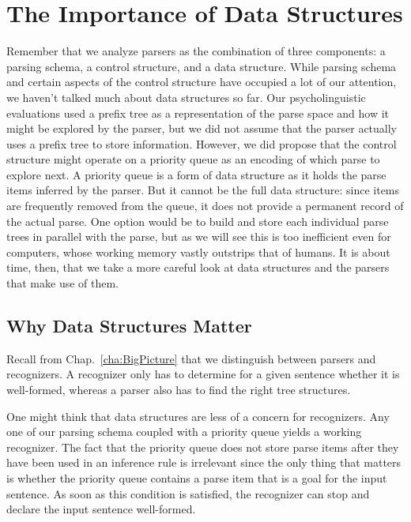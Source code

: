 \chapter{The Importance of Data Structures}
\label{cha:ChartParsing}

Remember that we analyze parsers as the combination of three components: a parsing schema, a control structure, and a data structure.
While parsing schema and certain aspects of the control structure have occupied a lot of our attention, we haven't talked much about data structures so far.
Our psycholinguistic evaluations used a prefix tree as a representation of the parse space and how it might be explored by the parser, but we did not assume that the parser actually uses a prefix tree to store information.
However, we did propose that the control structure might operate on a priority queue as an encoding of which parse to explore next.
A priority queue is a form of data structure as it holds the parse items inferred by the parser.
But it cannot be the full data structure: since items are frequently removed from the queue, it does not provide a permanent record of the actual parse.
One option would be to build and store each individual parse trees in parallel with the parse, but as we will see this is too inefficient even for computers, whose working memory vastly outstrips that of humans.
It is about time, then, that we take a more careful look at data structures and the parsers that make use of them. 

\section{Why Data Structures Matter}

Recall from Chap.~\ref{cha:BigPicture} that we distinguish between parsers and recognizers.
A recognizer only has to determine for a given sentence whether it is well-formed, whereas a parser also has to find the right tree structures.

One might think that data structures are less of a concern for recognizers.
Any one of our parsing schema coupled with a priority queue yields a working recognizer.
The fact that the priority queue does not store parse items after they have been used in an inference rule is irrelevant since the only thing that matters is whether the priority queue contains a parse item that is a goal for the input sentence.
As soon as this condition is satisfied, the recognizer can stop and declare the input sentence well-formed.

